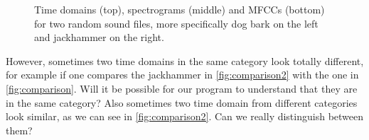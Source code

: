 \begin{figure} [H]%
	\centering
	
	\caption{Time domains (top), spectrograms (middle) and MFCCs (bottom) for two random sound files, more specifically dog bark on the left and jackhammer on the right.}%
	\label{fig:comparison}
\end{figure}
However, sometimes two time domains in the same category look totally different, for example if one compares the jackhammer in \eqref{fig:comparison2} with the one in \eqref{fig:comparison}. Will it be possible for our program to understand that they are in the same category? Also sometimes two time domain from different categories look similar, as we can see in \eqref{fig:comparison2}. Can we really distinguish between them?

